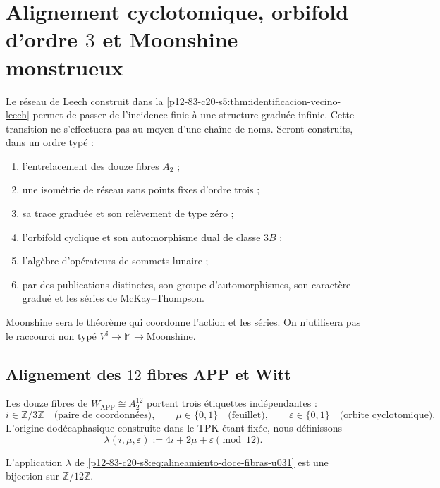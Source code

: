 \section{Alignement cyclotomique, orbifold d'ordre \(3\) et Moonshine monstrueux}
\label{p12-83-c20-s8:chap:alineamiento-orbifold-moonshine}

Le réseau de Leech construit dans la
\cref{p12-83-c20-s5:thm:identificacion-vecino-leech} permet de passer de l'incidence
finie à une structure graduée infinie. Cette transition ne s'effectuera pas
au moyen d'une chaîne de noms. Seront construits, dans un ordre typé :
\begin{enumerate}
 \item l'entrelacement des douze fibres \(A_2\) ;
 \item une isométrie de réseau sans points fixes d'ordre trois ;
 \item sa trace graduée et son relèvement de type zéro ;
 \item l'orbifold cyclique et son automorphisme dual de classe \(3B\) ;
 \item l'algèbre d'opérateurs de sommets lunaire ;
 \item par des publications distinctes, son groupe d'automorphismes, son caractère
       gradué et les séries de McKay--Thompson.
\end{enumerate}
Moonshine sera le théorème qui coordonne l'action et les séries. On n'utilisera pas
le raccourci non typé
\(V^\natural\to\mathbb M\to\text{Moonshine}\).

\subsection{Alignement des \(12\) fibres APP et Witt}

Les douze fibres de \(W_{\mathrm{APP}}\cong A_2^{12}\) portent trois
étiquettes indépendantes :
\[
 i\in\mathbb Z/3\mathbb Z
 \quad\text{(paire de coordonnées)},\qquad
 \mu\in\{0,1\}
 \quad\text{(feuillet)},\qquad
 \varepsilon\in\{0,1\}
 \quad\text{(orbite cyclotomique)}.
\]
L'origine dodécaphasique construite dans le TPK étant fixée, nous définissons
\begin{equation}
 \lambda(i,\mu,\varepsilon)
 :=4i+2\mu+\varepsilon\pmod{12}.
 \label{p12-83-c20-s8:eq:alineamiento-doce-fibras-u031}
\end{equation}

\begin{lemma}
\label{p12-83-c20-s8:lem:biyectividad-alineamiento-u031}
L'application \(\lambda\) de
\eqref{p12-83-c20-s8:eq:alineamiento-doce-fibras-u031} est une bijection sur
\(\mathbb Z/12\mathbb Z\).
\end{lemma}

